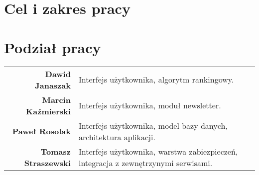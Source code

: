 \section{Cel i zakres pracy}


\section{Podział pracy}
\noindent\begin{tabular}{rp{9cm}}
\textbf{Dawid Janaszak} & Interfejs użytkownika, algorytm rankingowy.\\

\textbf{Marcin Kaźmierski} & Interfejs użytkownika, moduł newsletter.\\

\textbf{Paweł Rosolak} & Interfejs użytkownika, model bazy danych, architektura aplikacji.\\

\textbf{Tomasz Straszewski} & Interfejs użytkownika, warstwa zabiezpieczeń, integracja z zewnętrzynymi serwisami.\\
\end{tabular}

